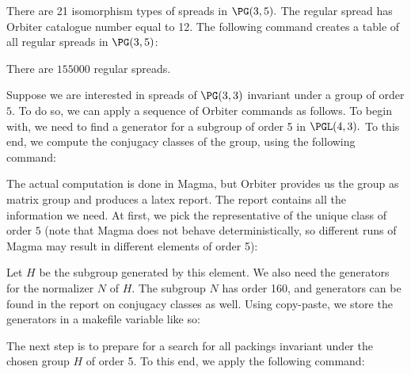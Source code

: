 \bigskip

There are 21 isomorphism types of spreads in $\PG(3,5).$ 
The regular spread has Orbiter catalogue number equal to 12. 
The following command creates a table of all regular spreads in $\PG(3,5)$:


There are $155000$ regular spreads.

\bigskip

Suppose we are interested in spreads of $\PG(3,3)$ invariant under a group of order $5.$ 
To do so, we can apply a sequence of Orbiter commands as follows.
To begin with, we need to find a generator for a subgroup of order 5 in $\PGL(4,3).$
To this end, we compute the conjugacy classes of the group, using the following command:



The actual computation is done in Magma, 
but Orbiter provides us the group as matrix group and produces a latex report.
The report contains all the information we need. 
At first, we pick the representative of the unique class of order $5$ 
(note that Magma does not behave deterministically, 
so different runs of Magma may result in different elements of order 5):


Let $H$ be the subgroup generated by this element. 
We also need the generators for the normalizer $N$ of $H$. 
The subgroup $N$ has order 160, 
and generators can be found in the report on conjugacy classes as well. 
Using copy-paste, we store the generators in a makefile variable like so:



The next step is to prepare for a search for all packings 
invariant under the chosen group $H$ of order 5.
To this end, we apply the following command:



